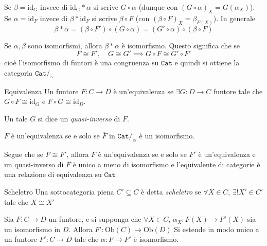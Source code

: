 \begin{note}[zione]
    Se \(\beta = \mathrm{id}_G \) invece di \(\mathrm{id_G} * \alpha\) si scrive
    \(G \circ \alpha\) (dunque con \({(G \circ \alpha)}_X = G{(\alpha_X)}\)). Se
    \(\alpha = \mathrm{id}_F\) invece di \(\beta * \mathrm{id}_F\) si scrive \(\beta \circ F\) (con \({(\beta \circ F)}_X = \beta_{F{(X)}} \)). In generale 
    \[
      \beta * \alpha = {(\beta \circ F')} \circ {(G \circ \alpha)} = {(G' \circ
      \alpha)} \circ {(\beta \circ F)}
    \]
\end{note}
\begin{remark}{}
    Se \(\alpha, \beta\) sono isomorfismi, allora \(\beta * \alpha\) è
    isomorfismo. Questo significa che se 
    \[
      F \cong F', \quad G \cong G' \implies G \circ F \cong G' \circ F'
    \]
    cioè l'isomorfismo di funtori è una congruenza su \(
    \mathtt{Cat}\) e quindi si ottiene la categoria \(\mathtt{Cat} /_{\cong}\)
\end{remark}
\begin{definition}{Equivalenza}
    Un funtore \(F: C \to D\) è un'equivalenza se \(\exists G : D \to C\)
    funtore tale che \(G \circ F \cong \mathrm{id}_G\) e \(F \circ G \cong \mathrm{id}_D\).

    Un tale \(G\) si dice un \emph{quasi-inverso} di \(F\).
\end{definition}
\begin{remark}{}
    \(F\) è un'equivalenza se e solo se \(\overline{F} \text{ in } \mathtt{Cat}/_{\cong} \) è un isomorfismo.
\end{remark}

Segue che se \(F \cong F'\), allora \(F\) è un'equivalenza se e solo se \(F'\) è
un'equivalenza e un quasi-inverso di \(F\) è unico a meno di isomorfismo e
l'equivalente di categorie è una relazione di equivalenza su \(\mathtt{Cat}\) 

\begin{definition}{Scheletro}
    Una sottocategoria piena \(C' \subseteq C \) è detta \emph{scheletro} se \(\forall X \in C\), \(\exists ! X' \in C'\) tale che \(X \cong X'\) 
\end{definition}

\begin{lemma}{}\label{lem:ext-scheletro}
    Sia \(F: C\to D\) un funtore, e si supponga che \(\forall X \in C\), \(\alpha_X : F{(X)} \to F'{(X)}\) sia un isomorfismo in \(D\). Allora \(F' : \mathrm{Ob}{(C)} \to \mathrm{Ob}{(D)}\) Si estende in modo unico a un funtore \(F' : C \to D\) tale che \(\alpha : F \to F'\) è isomorfismo.
\end{lemma}

